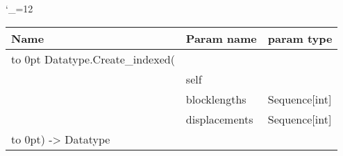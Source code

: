 \begingroup \catcode`\_=12 \tt
\begin{tabular}{lll}
\toprule
\textrm{Name}&\textrm{Param name}&\textrm{param type}\\
\midrule
\hbox to 0pt {Datatype.Create_indexed(\hss}\\
& self\\
& blocklengths & Sequence[int]\\
& displacements & Sequence[int]\\
\hbox to 0pt{) -> Datatype\hss}\\
\bottomrule
\end{tabular}
\endgroup
